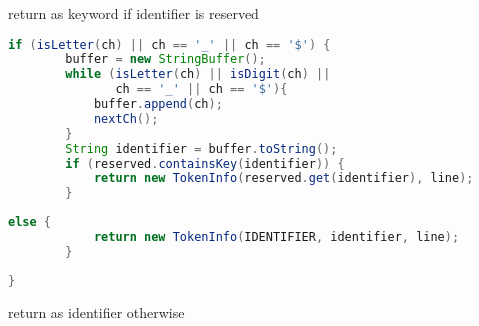 \documentclass[8pt,a4paper,compress]{beamer}
\begin{document}
\begin{frame}[fragile]
\begin{overprint}
\begin{tcolorbox}[enhanced,drop shadow southwest,sharp corners,size=fbox,colback=white,fontlower=\small\ttfamily,collower=silver900]
\tcblower
\begin{minipage}[t][.25cm][t]{\textwidth}
return as keyword if identifier is reserved
\end{minipage}
\end{tcolorbox}

\begin{tcolorbox}[enhanced,drop shadow southwest,sharp corners,size=fbox,colback=white,fontlower=\small\ttfamily,collower=silver900]

\begin{lstlisting}[language=Java,style=focusout]
    if (isLetter(ch) || ch == '_' || ch == '$') {
        buffer = new StringBuffer();
        while (isLetter(ch) || isDigit(ch) || 
               ch == '_' || ch == '$'){
            buffer.append(ch);
            nextCh();
        }
        String identifier = buffer.toString();                 
        if (reserved.containsKey(identifier)) {
            return new TokenInfo(reserved.get(identifier), line); 
        }
\end{lstlisting}
\begin{lstlisting}[language=Java,style=focusin,backgroundcolor=\color{lime100}]
        else {                     
            return new TokenInfo(IDENTIFIER, identifier, line);                 
        }
\end{lstlisting}
\begin{lstlisting}[language=Java,style=focusout]
    }
\end{lstlisting}

\tcblower
\begin{minipage}[t][.25cm][t]{\textwidth}
return as identifier otherwise
\end{minipage}
\end{tcolorbox}
\end{overprint}
\end{frame}

\begin{frame}[fragile]
\pause

A state transition diagram for recognizing separators and operators

\begin{center}
}
\end{center}
\end{frame}
\end{document}
